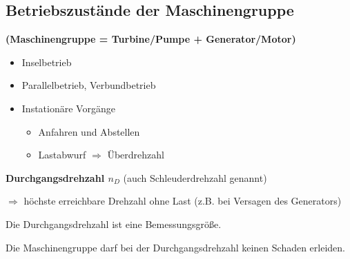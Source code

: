 

\subsection{Betriebszustände der Maschinengruppe}
    \textbf{(Maschinengruppe = Turbine/Pumpe + Generator/Motor)}

    \begin{itemize}
        \item Inselbetrieb
        \item Parallelbetrieb, Verbundbetrieb
        \item Instationäre Vorgänge
        \begin{itemize}
            \item Anfahren und Abstellen
            \item Lastabwurf $\Rightarrow$ Überdrehzahl
        \end{itemize}
    \end{itemize}

    \textbf{Durchgangsdrehzahl $n_D$} (auch Schleuderdrehzahl genannt)

    $\Rightarrow$ höchste erreichbare Drehzahl ohne Last (z.B. bei Versagen des Generators)

    Die Durchgangsdrehzahl ist eine Bemessungsgröße. 

    Die Maschinengruppe darf bei der Durchgangsdrehzahl keinen Schaden erleiden.

